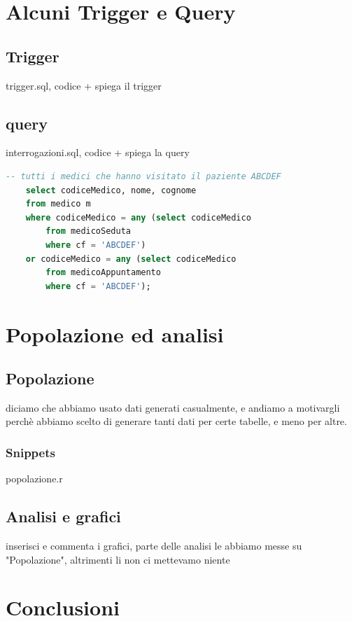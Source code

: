 \documentclass[11pt]{article}
\begin{document}
\section{Alcuni Trigger e Query}
\subsection{Trigger}
\label{trig:trigger1}
trigger.sql, codice + spiega il trigger
\subsection{query}
interrogazioni.sql, codice + spiega la query
\begin{lstlisting}[language=SQL]
    -- tutti i medici che hanno visitato il paziente ABCDEF
    select codiceMedico, nome, cognome
    from medico m
    where codiceMedico = any (select codiceMedico
        from medicoSeduta
        where cf = 'ABCDEF')
    or codiceMedico = any (select codiceMedico
        from medicoAppuntamento
        where cf = 'ABCDEF');
\end{lstlisting}


\section{Popolazione ed analisi}
\subsection{Popolazione}
\label{pop:popolazione}
diciamo che abbiamo usato dati generati casualmente, e andiamo a motivargli perchè abbiamo scelto di generare 
tanti dati per certe tabelle, e meno per altre.
\subsubsection{Snippets}
popolazione.r
\subsection{Analisi e grafici}
inserisci e commenta i grafici, parte delle analisi le abbiamo messe su "Popolazione", altrimenti li non ci mettevamo niente

\section{Conclusioni}
\end{document}
